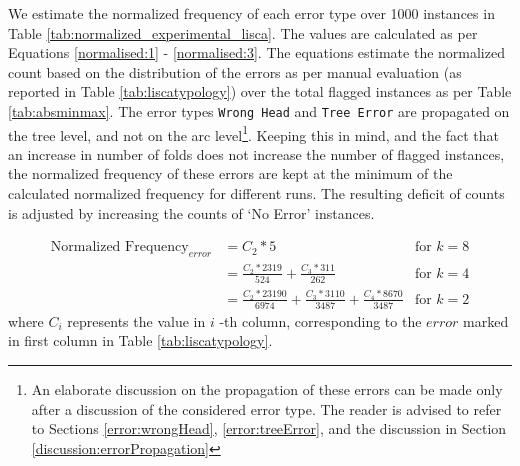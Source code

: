 We estimate the normalized frequency of each error type over 1000 instances in Table \ref{tab:normalized_experimental_lisca}. The values are calculated as per Equations \ref{normalised:1} - \ref{normalised:3}. The equations estimate the normalized count based on the distribution of the errors as per manual evaluation (as reported in Table \ref{tab:liscatypology}) over the total flagged instances as per Table \ref{tab:absminmax}. The error types \texttt{Wrong Head} and \texttt{Tree Error} are propagated on the tree level, and not on the arc level\footnote{An elaborate discussion on the propagation of these errors can be made only after a discussion of the considered error type. The reader is advised to refer to Sections \ref{error:wrongHead}, \ref{error:treeError}, and the discussion in Section \ref{discussion:errorPropagation}}. Keeping this in mind, and the fact that an increase in number of folds does not increase the number of flagged instances, the normalized frequency of these errors are kept at the minimum of the calculated normalized frequency for different runs. The resulting deficit of counts is adjusted by increasing the counts of `No Error' instances.

\begin{align}
    \text{Normalized Frequency}_{error} &= C_{2} * 5 &\text{for }k=8 \label{normalised:1}\\
    & = \frac{C_{2} * 2319}{524} + \frac{C_{3} * 311}{262} & \text{for }k=4 \label{normalised:2}\\
    & = \frac{C_{2} * 23190}{6974} + \frac{C_{3} * 3110}{3487} + \frac{C_{4} * 8670}{3487}& \text{for }k=2 \label{normalised:3}
\end{align}
    where \(C_{i}\) represents the value in \(i\) -th column, corresponding to the \(error\) marked in first column in Table \ref{tab:liscatypology}.

